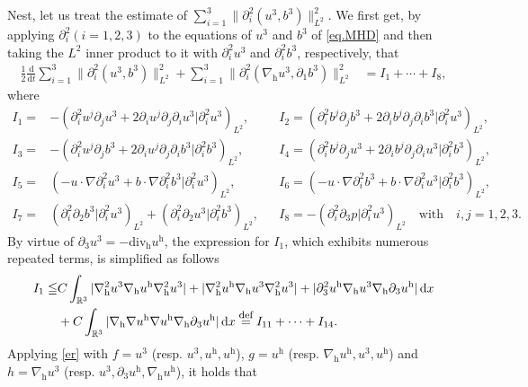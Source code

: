 \documentclass[11pt]{amsart}
\theoremstyle{definition}
\newcommand{\R}{\mathbb{R}}
\newcommand{\h}{\mathrm{h}}
\def\eqdefa{\buildrel\hbox{\footnotesize def}\over =}
\newcommand{\dx}{\,{\rm d}x}
\newcommand{\nablah}{\nabla_{\mathrm{h}}}
\numberwithin{equation}{section}
\begin{document}
Nest, let us treat the estimate of $\sum_{i=1}^3\|\partial_{i}^2(u^3,b^3)\|_{L^2}^{2}$.  We first get, by applying $\partial_{i}^2(i=1,2,3)$ to the equations of  $u^3$ and $b^3$ of \eqref{eq.MHD}  and then taking the $L^2$ inner product to it with $\partial_{i}^2u^3$ and $\partial_{i}^2b^3$, respectively, that
\begin{align}\label{en_H2_v}
	\frac12\frac{\mathrm{d}}{\mathrm{d}t}\sum_{i=1}^{3}\|\partial_{i}^2(u^3,b^3)\|_{L^2}^2+\sum_{i=1}^{3}\|\partial_{i}^2(\nabla_{\mathrm{h}}u^3,\partial_{1}b^3)\|_{L^2}^2&=I_{1}+\cdots+I_{8},
\end{align}
where
\begin{align*}
	I_{1}
	=&-\left(\partial_{i}^2u^j\partial_ju^3+2\partial_{i}u^j\partial_j \partial_{i}u^3|\partial_{i}^2u^3\right)_{L^2},&&I_{2}=\left(\partial_{i}^2b^j\partial_jb^3+2\partial_{i}b^j\partial_j \partial_{i}b^3|\partial_{i}^2u^3\right)_{L^2},\\
	I_{3}
	=&-\left(\partial_{i}^2u^j\partial_jb^3+2\partial_{i}u^j\partial_j \partial_{i}b^3|\partial_{i}^2b^3\right)_{L^2},&&I_{4}=\left(\partial_{i}^2b^j\partial_ju^3+2\partial_{i}b^j\partial_j \partial_{i}u^3|\partial_{i}^2b^3\right)_{L^2},\\
	I_{5}
	=&\left(-u\cdot\nabla \partial_{i}^2u^3+b\cdot\nabla \partial_{i}^2b^3|\partial_{i}^2u^3\right)_{L^2},&&I_{6}=\left(-u\cdot\nabla \partial_{i}^2b^3+b\cdot\nabla \partial_{i}^2u^3|\partial_{i}^2b^3\right)_{L^2},\\
	I_{7}=&\left( \partial_{i}^2\partial_{2}b^3|\partial_{i}^2u^3 \right)_{L^2}+\left( \partial_{i}^2\partial_{2}u^3|\partial_{i}^2b^3 \right)_{L^2} ,&&I_{8}=-\left(\partial_{i}^2\partial_{3}p|\partial_{i}^2u^3\right)_{L^2} \quad \mathrm{with}\quad i,j=1,2,3.
\end{align*}
By virtue of $\partial_3u^3=-\mathrm{div_h}u^\h$, the expression for $I_1$, which exhibits numerous repeated terms, is simplified as follows
\begin{align}\label{I1rewrite}
	I_{1}\leqq& C\int_{\R^3}|\nablah^2u^3\nablah u^\h \nablah^2 u^3|+|\nablah^2u^\h\nablah u^3 \nablah^2 u^3|+|\partial_3^2u^\h\nablah u^3 \nablah\partial_3 u^\h|\dx\nonumber\\
	&+C\int_{\R^3}|\nablah\nabla u^\h\nabla u^\h \nablah \partial_3u^\h|\dx\eqdefa I_{11}+\cdots+I_{14}.
\end{align}
Applying \eqref{er} with $f=u^3$ (resp. $u^3,u^\h,u^\h$), $g=u^{\mathrm{h}}$ (resp. $\nablah u^\h,u^3,u^\h$)  and $h=\nabla_{\mathrm{h}}u^3$ (resp. $u^{3},\partial_3u^\h,\nablah u^\h$), it holds that
\end{document}
